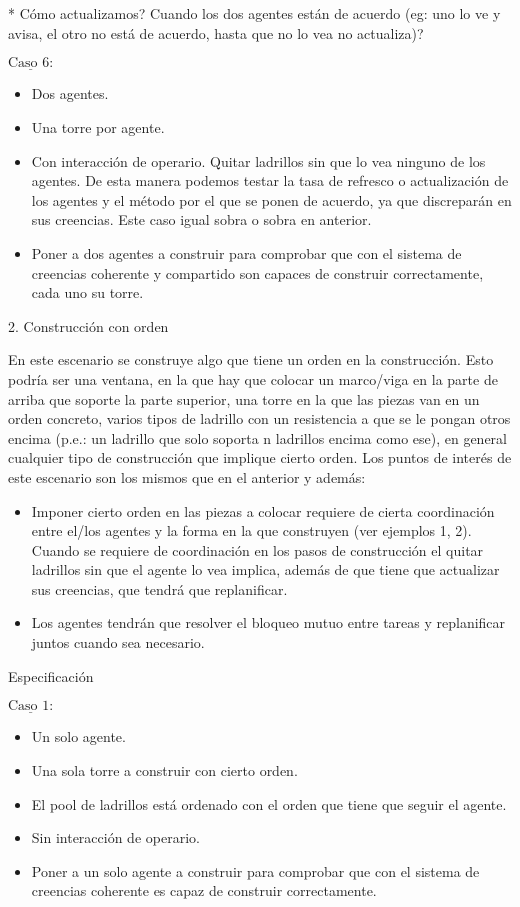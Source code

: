 \documentclass[12pt]{report}
\newcommand{\textunderline}[1]{$\underline{\mbox{#1}}$} %
\newcommand{\mksection}[1]{{\large {\color{NavyBlue} #1}}}
\begin{document}
    * C\'omo actualizamos? Cuando los dos agentes est\'an de acuerdo (eg: uno lo ve y avisa, el otro no est\'a de acuerdo, hasta que no lo vea no actualiza)?

  \textunderline{Caso 6:}
    \begin{itemize}
      \item Dos agentes.
      \item Una torre por agente.
      \item Con interacci\'on de operario. Quitar ladrillos sin que lo vea ninguno de los agentes. De esta manera podemos testar la tasa de refresco o actualizaci\'on de los agentes y el m\'etodo por el que se ponen de acuerdo, ya que discrepar\'an en sus creencias. Este caso igual sobra o sobra en anterior.
      \item Poner a dos agentes a construir para comprobar que con el sistema de creencias coherente y compartido son capaces de construir correctamente, cada uno su torre.
    \end{itemize}

\clearpage
\mksection{\normalsize{2. Construcci\'on con orden}}

  En este escenario se construye algo que tiene un orden en la construcci\'on. Esto podr\'ia ser una ventana, en la que hay que colocar un marco/viga en la parte de arriba que soporte la parte superior, una torre en la que las piezas van en un orden concreto, varios tipos de ladrillo con un resistencia a que se le pongan otros encima (p.e.: un ladrillo que solo soporta n ladrillos encima como ese), en general cualquier tipo de construcci\'on que implique cierto orden. Los puntos de inter\'es de este escenario son los mismos que en el anterior y adem\'as:

  \begin{itemize}
    \item Imponer cierto orden en las piezas a colocar requiere de cierta coordinaci\'on entre el/los agentes y la forma en la que construyen (ver ejemplos 1, 2). Cuando se requiere de coordinaci\'on en los pasos de construcci\'on el quitar ladrillos sin que el agente lo vea implica, adem\'as de que tiene que actualizar sus creencias, que tendr\'a que replanificar.
    \item Los agentes tendr\'an que resolver el bloqueo mutuo entre tareas y replanificar juntos cuando sea necesario.
  \end{itemize}

\mksection{\normalsize{Especificaci\'on}}

  \textunderline{Caso 1:}
    \begin{itemize}
      \item Un solo agente.
      \item Una sola torre a construir con cierto orden.
      \item El pool de ladrillos est\'a ordenado con el orden que tiene que seguir el agente.
      \item Sin interacci\'on de operario.
      \item Poner a un solo agente a construir para comprobar que con el sistema de creencias coherente es capaz de construir correctamente.
    \end{itemize}
\end{document}

